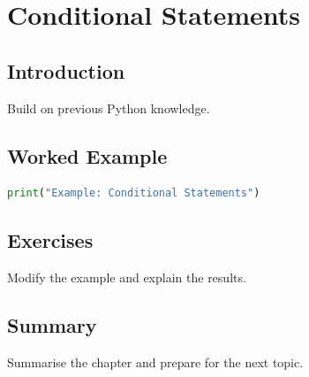 \chapter{Conditional Statements}
\label{chap:vol3-6}


\section{Introduction}
Build on previous Python knowledge.

\section{Worked Example}
\begin{lstlisting}[language=Python]
print("Example: Conditional Statements")
\end{lstlisting}

\section{Exercises}
\begin{exercise}
Modify the example and explain the results.
\end{exercise}

\section{Summary}
Summarise the chapter and prepare for the next topic.
